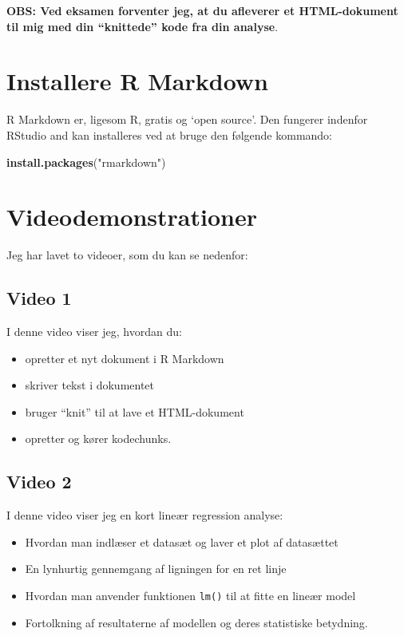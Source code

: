 \documentclass[
]{book}
\newenvironment{Shaded}{\begin{snugshade}}{\end{snugshade}}
\newcommand{\FunctionTok}[1]{\textcolor[rgb]{0.13,0.29,0.53}{\textbf{#1}}}
\newcommand{\NormalTok}[1]{#1}
\newcommand{\StringTok}[1]{\textcolor[rgb]{0.31,0.60,0.02}{#1}}
\providecommand{\tightlist}{%
  \setlength{\itemsep}{0pt}\setlength{\parskip}{0pt}}
\begin{document}
\textbf{OBS: Ved eksamen forventer jeg, at du afleverer et HTML-dokument til mig med din ``knittede'' kode fra din analyse}.

\section{Installere R Markdown}\label{installere-r-markdown}

R Markdown er, ligesom R, gratis og `open source'. Den fungerer indenfor RStudio and kan installeres ved at bruge den følgende kommando:

\begin{Shaded}
\begin{Highlighting}[]
\FunctionTok{install.packages}\NormalTok{(}\StringTok{"rmarkdown"}\NormalTok{)}
\end{Highlighting}
\end{Shaded}

\section{Videodemonstrationer}\label{videodemonstrationer}

Jeg har lavet to videoer, som du kan se nedenfor:

\subsection{Video 1}\label{video-1}

I denne video viser jeg, hvordan du:

\begin{itemize}
\tightlist
\item
  opretter et nyt dokument i R Markdown
\item
  skriver tekst i dokumentet
\item
  bruger ``knit'' til at lave et HTML-dokument
\item
  opretter og kører kodechunks.
\end{itemize}

\subsection{Video 2}\label{video-2}

I denne video viser jeg en kort lineær regression analyse:

\begin{itemize}
\tightlist
\item
  Hvordan man indlæser et datasæt og laver et plot af datasættet
\item
  En lynhurtig gennemgang af ligningen for en ret linje
\item
  Hvordan man anvender funktionen \texttt{lm()} til at fitte en lineær model
\item
  Fortolkning af resultaterne af modellen og deres statistiske betydning.
\end{itemize}
\end{document}

